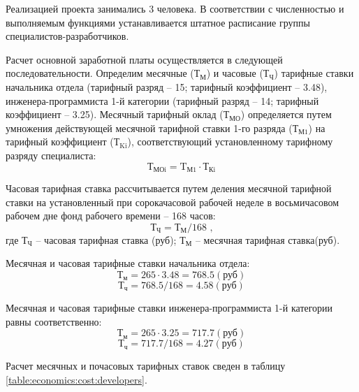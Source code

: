 Реализацией проекта занимались 3 человека. В соответствии с численностью и выполняемым функциями устанавливается штатное расписание \linebreak группы специалистов-разработчиков.

Расчет основной заработной платы осуществляется в следующей последовательности. Определим месячные (${\text{Т}}_{\text{М}}$) и часовые (${\text{Т}}_{\text{Ч}}$) тарифные ставки начальника отдела (тарифный разряд -- 15; тарифный коэффициент – 3.48), инженера-программиста 1-й категории (тарифный разряд -- 14; тарифный коэффициент -- 3.25). Месячный тарифный оклад (${\text{Т}}_{\text{МО}}$) определяется путем умножения действующей месячной тарифной ставки 1-го разряда (${\text{Т}}_{\text{М1}}$) на тарифный коэффициент (${\text{Т}}_{\text{Ki}}$), соответствующий установленному тарифному разряду специалиста:
\begin{equation}
\label{formula:economics:cost:f_tmoi}
{\text{Т}}_{\text{МОi}} = {\text{T}}_{\text{М1}} \cdot {\text{Т}}_{\text{Кi}}
\end{equation}

Часовая тарифная ставка рассчитывается путем деления месячной тарифной ставки на установленный при сорокачасовой рабочей неделе в восьмичасовом рабочем дне фонд рабочего времени – 168 часов:
\begin{equation}
\label{formula:economics:cost:f_chts}
{\text{Т}}_{\text{Ч}} = {\text{Т}}_{\text{М}} / 168 \text{ ,}
\end{equation}
где ${\text{Т}}_{\text{Ч}}$ -- часовая тарифная ставка (руб); ${\text{Т}}_{\text{М}}$ -- месячная тарифная ставка(руб).

Месячная и часовая тарифные ставки начальника отдела:
$${\text{Т}}_{\text{м}} = 265 \cdot 3.48 = 768.5 (\text{руб})$$
$${\text{Т}}_{\text{ч}} = 768.5 / 168 = 4.58 (\text{руб})$$

Месячная и часовая тарифные ставки инженера-программиста 1-й категории равны соответственно:
$${\text{Т}}_{\text{м}} = 265 \cdot 3.25 = 717.7 (\text{руб})$$
$${\text{Т}}_{\text{ч}} = 717.7 / 168 = 4.27 (\text{руб})$$

Расчет месячных и почасовых тарифных ставок сведен в таблицу \ref{table:economics:cost:developers}.

